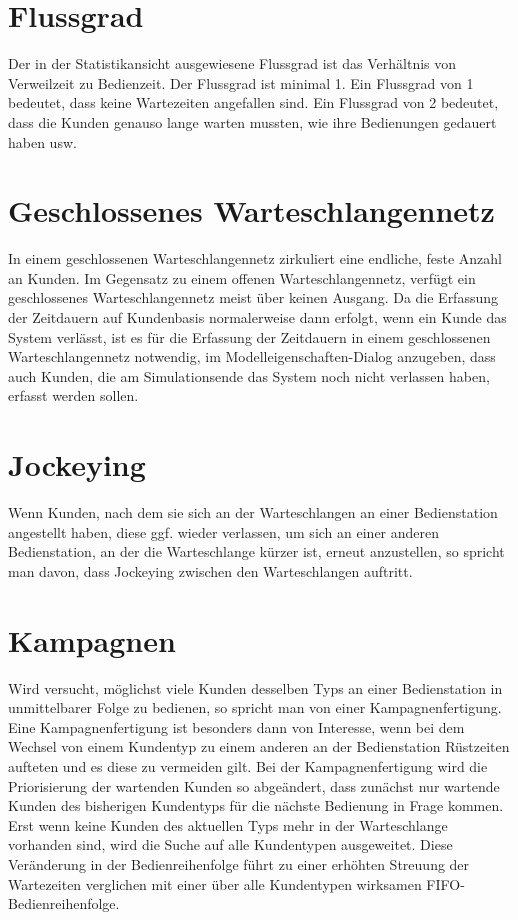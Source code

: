 \section*{Flussgrad}


Der in der Statistikansicht ausgewiesene Flussgrad ist
das Verhältnis von Verweilzeit zu Bedienzeit. Der Flussgrad ist minimal 1. Ein Flussgrad
von 1 bedeutet, dass keine Wartezeiten angefallen sind. Ein Flussgrad von 2 bedeutet, dass
die Kunden genauso lange warten mussten, wie ihre Bedienungen gedauert haben usw.

\section*{Geschlossenes Warteschlangennetz}


In einem geschlossenen Warteschlangennetz zirkuliert eine endliche, feste Anzahl an Kunden.
Im Gegensatz zu einem offenen Warteschlangennetz, verfügt ein geschlossenes Warteschlangennetz
meist über keinen Ausgang. Da die Erfassung der Zeitdauern
auf Kundenbasis normalerweise dann erfolgt, wenn ein Kunde das System verlässt, ist es für die Erfassung
der Zeitdauern in einem geschlossenen Warteschlangennetz notwendig, im
Modelleigenschaften-Dialog anzugeben, dass auch Kunden, die am
Simulationsende das System noch nicht verlassen haben, erfasst werden sollen.

\section*{Jockeying}


Wenn Kunden, nach dem sie sich an der Warteschlangen an einer Bedienstation angestellt haben,
diese ggf. wieder verlassen, um sich an einer anderen Bedienstation, an der die Warteschlange
kürzer ist, erneut anzustellen, so spricht man davon, dass Jockeying zwischen den Warteschlangen auftritt.

\section*{Kampagnen}


Wird versucht, möglichst viele Kunden desselben Typs an einer Bedienstation
in unmittelbarer Folge zu bedienen, so spricht man von einer Kampagnenfertigung. Eine Kampagnenfertigung ist
besonders dann von Interesse, wenn bei dem Wechsel von einem Kundentyp zu einem anderen an der Bedienstation
Rüstzeiten aufteten und es diese zu vermeiden gilt. Bei der Kampagnenfertigung wird die Priorisierung der
wartenden Kunden so abgeändert, dass zunächst nur wartende Kunden des bisherigen Kundentyps für die nächste
Bedienung in Frage kommen. Erst wenn keine Kunden des aktuellen Typs mehr in der Warteschlange vorhanden sind,
wird die Suche auf alle Kundentypen ausgeweitet. Diese Veränderung in der Bedienreihenfolge führt zu einer
erhöhten Streuung der Wartezeiten verglichen mit einer über alle Kundentypen wirksamen FIFO-Bedienreihenfolge.


